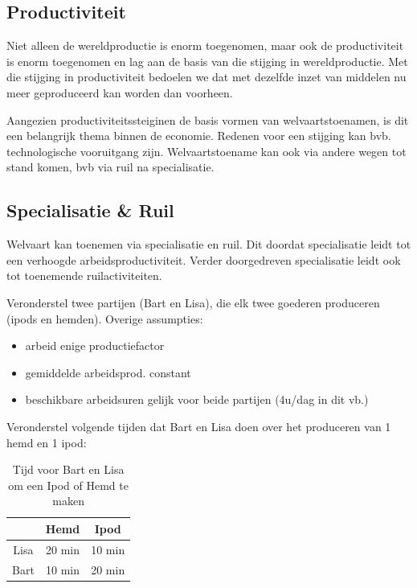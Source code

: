 \subsection{Productiviteit}
Niet alleen de wereldproductie is enorm toegenomen, maar ook de productiviteit is enorm toegenomen en lag aan de basis van die stijging in wereldproductie. Met die stijging in productiviteit bedoelen we dat met dezelfde inzet van middelen nu meer geproduceerd kan worden dan voorheen.

Aangezien productiviteitssteiginen de basis vormen van welvaartstoenamen, is dit een belangrijk thema binnen de economie. Redenen voor een stijging kan bvb. technologische vooruitgang zijn. Welvaartstoename kan ook via andere wegen tot stand komen, bvb via ruil na specialisatie.

\subsection{Specialisatie \& Ruil}
\label{ssec:SpecialisatieEnRuil}

Welvaart kan toenemen via specialisatie en ruil. Dit doordat specialisatie leidt tot een verhoogde arbeidsproductiviteit. Verder doorgedreven specialisatie leidt ook tot toenemende ruilactiviteiten.

Veronderstel twee partijen (Bart en Lisa), die elk twee goederen produceren (ipods en hemden). Overige assumpties:
\begin{itemize}
	\item arbeid enige productiefactor
    \item gemiddelde arbeidsprod. constant
    \item beschikbare arbeidsuren gelijk voor beide partijen (4u/dag in dit vb.)
\end{itemize}

Veronderstel volgende tijden dat Bart en Lisa doen over het produceren van 1 hemd en 1 ipod:

\begin{table}[h]
	\centering
    \begin{tabular}{ | c |  c |  c | }
		\hline
		& Hemd  &  Ipod \\
		\hline
		 Lisa & 20 min & 10 min \\
		\hline
		Bart & 10 min & 20 min\\
		\hline
	\end{tabular}
	\caption{Tijd voor Bart en Lisa om een Ipod of Hemd te maken}

\end{table}


